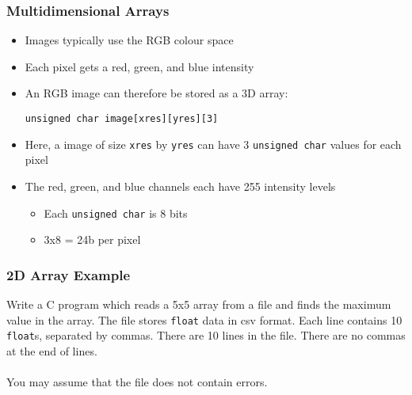 \documentclass[14pt]{beamer}
\begin{document}
\begin{frame}[fragile]
\frametitle{Multidimensional Arrays}
\begin{itemize}
\item Images typically use the RGB colour space
\item Each pixel gets a red, green, and blue intensity
\item An RGB image can therefore be stored as a 3D array:
\begin{lstlisting}[style=CStyle]
unsigned char image[xres][yres][3]
\end{lstlisting}
\item Here, a image of size \texttt{xres} by \texttt{yres} can have 3 \texttt{unsigned char} values for each pixel
\item The red, green, and blue channels each have 255 intensity levels
	\begin{itemize}
		\item Each \texttt{unsigned char} is 8 bits
		\item 3x8 = 24b per pixel
	\end{itemize}
\end{itemize}
\end{frame}

\begin{frame}
\frametitle{2D Array Example}
Write a C program which reads a 5x5 array from a file and finds the maximum value in the array. The file stores \texttt{float} data in csv format. Each line contains 10 \texttt{float}s, separated by commas. There are 10 lines in the file. There are no commas at the end of lines.
\\~\\
You may assume that the file does not contain errors.
\end{frame}
\end{document}

